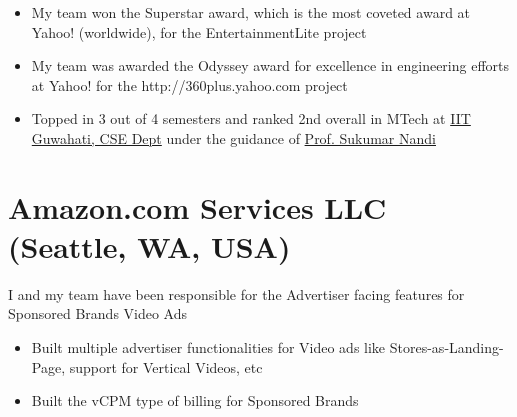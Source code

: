 \documentclass[11pt,a4paper,sans]{moderncv} %
\newcommand\Colorhref[3][blue]{\href{#2}{\small\color{#1}#3}}
\begin{document}
\begin{itemize}
\item My team won the Superstar award, which is the most coveted award at Yahoo! (worldwide), for the EntertainmentLite project
\item My team was awarded the Odyssey award for excellence in engineering efforts at Yahoo! for the http://360plus.yahoo.com project
\item Topped in 3 out of 4 semesters and ranked 2nd overall in MTech at \Colorhref{https://www.iitg.ac.in/cse/}{IIT Guwahati, CSE Dept} under the guidance of \Colorhref{https://www.iitg.ac.in/sukumar/consultancy.html}{Prof. Sukumar Nandi}
\end{itemize}

\newpage{}
\section{Amazon.com Services LLC (Seattle, WA, USA)}
         {I and my team have been responsible for the Advertiser facing features for Sponsored Brands Video Ads
           \begin{itemize}
           \item Built multiple advertiser functionalities for Video ads like Stores-as-Landing-Page, support for Vertical Videos, etc
           \item Built the vCPM type of billing for Sponsored Brands
         \end{itemize}}
\end{document}
